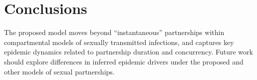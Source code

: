 \section{Conclusions}
The proposed model moves beyond ``instantaneous'' partnerships
within compartmental models of sexually transmitted infections,
and captures key epidemic dynamics related to partnership duration and concurrency.
Future work should explore differences in inferred epidemic drivers under
the proposed and other models of sexual partnerships.
